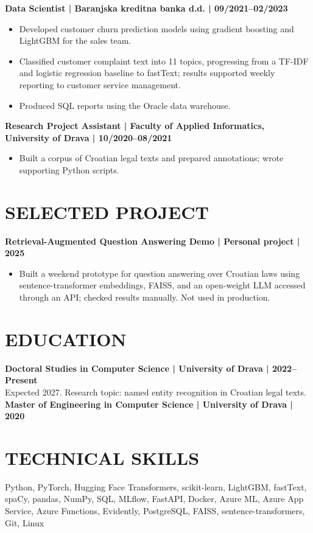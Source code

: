 \documentclass[11pt,a4paper]{article}
\begin{document}
\textbf{Data Scientist | Baranjska kreditna banka d.d. | 09/2021--02/2023}
\begin{itemize}
\item Developed customer churn prediction models using gradient boosting and LightGBM for the sales team.
\item Classified customer complaint text into 11 topics, progressing from a TF-IDF and logistic regression baseline to fastText; results supported weekly reporting to customer service management.
\item Produced SQL reports using the Oracle data warehouse.
\end{itemize}

\textbf{Research Project Assistant | Faculty of Applied Informatics, University of Drava | 10/2020--08/2021}
\begin{itemize}
\item Built a corpus of Croatian legal texts and prepared annotations; wrote supporting Python scripts.
\end{itemize}

\section*{SELECTED PROJECT}
\textbf{Retrieval-Augmented Question Answering Demo | Personal project | 2025}
\begin{itemize}
\item Built a weekend prototype for question answering over Croatian laws using sentence-transformer embeddings, FAISS, and an open-weight LLM accessed through an API; checked results manually. Not used in production.
\end{itemize}

\section*{EDUCATION}
\textbf{Doctoral Studies in Computer Science | University of Drava | 2022--Present}\\
Expected 2027. Research topic: named entity recognition in Croatian legal texts.\\[0.4em]
\textbf{Master of Engineering in Computer Science | University of Drava | 2020}

\section*{TECHNICAL SKILLS}
Python, PyTorch, Hugging Face Transformers, scikit-learn, LightGBM, fastText, spaCy, pandas, NumPy, SQL, MLflow, FastAPI, Docker, Azure ML, Azure App Service, Azure Functions, Evidently, PostgreSQL, FAISS, sentence-transformers, Git, Linux
\end{document}
